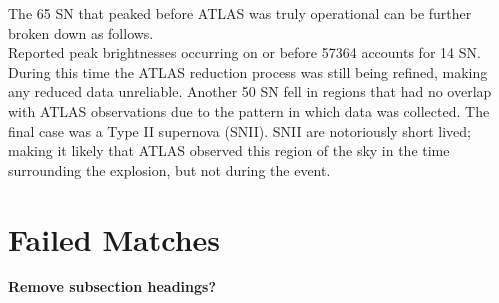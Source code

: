 \documentclass[aps,prb,twocolumn,superscriptaddress]{revtex4-1}
\begin{document}
\indent The 65 SN that peaked before ATLAS was truly operational can be further broken down as follows.\\
Reported peak brightnesses occurring on or before 57364 accounts for 14 SN. 
During this time the ATLAS reduction process was still being refined, making 
any reduced data unreliable.
Another 50 SN fell in regions that had no overlap with ATLAS observations due 
to the pattern in which data was collected.
The final case was a Type II supernova (SNII).
SNII are notoriously short lived; making it likely that ATLAS observed this region of the sky in the 
time surrounding the explosion, but not during the event.




\section{Failed Matches}

{\bf Remove subsection headings?}
\end{document}
